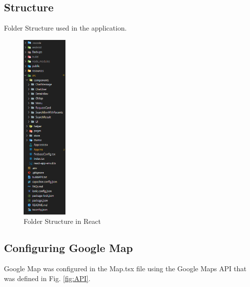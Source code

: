     \pagebreak

    \subsection{Structure}
    Folder Structure used in the application.
    \begin{figure}[h]
        \centering
        \includegraphics[width=0.2\textwidth]{images/folderStructure.png}
        \caption{Folder Structure in React}
        \label{fig:folderStructure}
    \end{figure}

    \pagebreak


    \subsection{Configuring Google Map}
    Google Map was configured in the Map.tsx file using the Google Maps API that was defined in Fig. \ref*{fig:API}.

